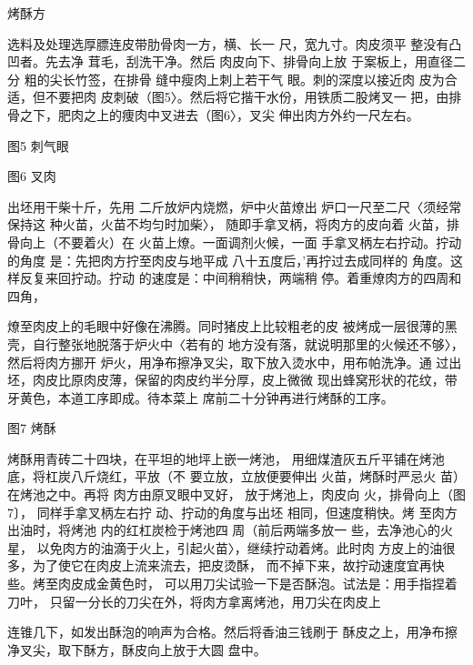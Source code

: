 \begin{recipe}{烤酥方}

\ingredients


\cooking

\step 选料及处理选厚膘连皮带肋骨肉一方，横、长一 尺，宽九寸。肉皮须平
整没有凸凹者。先去净 茸毛，刮洗干净。然后 肉皮向下、排骨向上放
于案板上，用直径二分 粗的尖长竹签，在排骨 缝中瘦肉上刺上若干气
眼。刺的深度以接近肉 皮为合适，但不要把肉
皮刺破（图5〉。然后将它揩干水份，用铁质二股烤叉一
把，由排骨之下，肥肉之上的痩肉中叉进去（图6〉，叉尖 伸出肉方外约一尺左右。

图5 刺气眼

图6 叉肉

\step 出坯用干柴十斤，先用 二斤放炉内烧燃，炉中火苗燎出
炉口一尺至二尺〈须经常保持这 种火苗，火苗不均匀时加柴〉，
随即手拿叉柄，将肉方的皮向着 火苗，排骨向上（不要着火）在
火苗上燎。一面调剂火候，一面 手拿叉柄左右拧动。拧动的角度
是：先把肉方拧至肉皮与地平成 八十五度后，'再拧过去成同样的
角度。这样反复来回拧动。拧动 的速度是：中间稍稍快，两端稍
停。着重燎肉方的四周和四角，

燎至肉皮上的毛眼中好像在沸腾。同时猪皮上比较粗老的皮
被烤成一层很薄的黑壳，自行整张地脱落于炉火中〈若有的
地方没有落，就说明那里的火候还不够〉，然后将肉方挪开
炉火，用净布擦净叉尖，取下放入烫水中，用布帕洗净。通
过出坯，肉皮比原肉皮薄，保留的肉皮约半分厚，皮上微微
现出蜂窝形状的花纹，带牙黄色，本道工序即成。待本菜上
席前二十分钟再进行烤酥的工序。

图7 烤酥

\step 烤酥用青砖二十四块，在平坦的地坪上嵌一烤池，
用细煤渣灰五斤平铺在烤池底，将杠炭八斤烧红，平放（不
要立放，立放便要伸出 火苗，烤酥时严忌火 苗）在烤池之中。再将
肉方由原叉眼中叉好， 放于烤池上，肉皮向 火，排骨向上（图7〕，
同样手拿叉柄左右拧 动、拧动的角度与出坯 相同，但速度稍快。烤
至肉方出油时，将烤池 内的红杠炭检于烤池四 周（前后两端多放一
些，去净池心的火星， 以免肉方的油滴于火上，引起火苗〉，继续拧动着烤。此时肉
方皮上的油很多，为了使它在肉皮上流来流去，把皮烫酥，
而不掉下来，故拧动速度宜再快些。烤至肉皮成金黄色时，
可以用刀尖试验一下是否酥泡。试法是：用手指捏着刀叶，
只留一分长的刀尖在外，将肉方拿离烤池，用刀尖在肉皮上

连锥几下，如发出酥泡的响声为合格。然后将香油三钱刷于
酥皮之上，用净布擦净叉尖，取下酥方，酥皮向上放于大圆 盘中。


\end{recipe}
